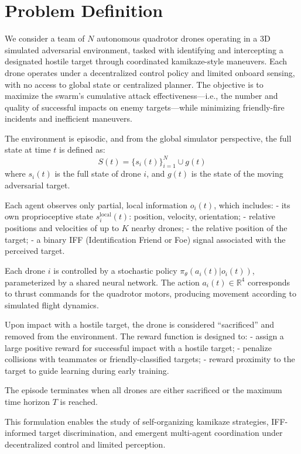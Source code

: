 \section{Problem Definition}
    We consider a team of \( N \) autonomous quadrotor drones operating in a 3D simulated adversarial environment, tasked with identifying and intercepting a designated hostile target through coordinated kamikaze-style maneuvers. Each drone operates under a decentralized control policy and limited onboard sensing, with no access to global state or centralized planner. The objective is to maximize the swarm's cumulative attack effectiveness—i.e., the number and quality of successful impacts on enemy targets—while minimizing friendly-fire incidents and inefficient maneuvers.
    \medskip

    The environment is episodic, and from the global simulator perspective, the full state at time \( t \) is defined as:
    \[
    S(t) = \{s_i(t)\}_{i=1}^N \cup g(t)
    \]
    where \( s_i(t) \) is the full state of drone \( i \), and \( g(t) \) is the state of the moving adversarial target.
    \medskip

    Each agent observes only partial, local information \( o_i(t) \), which includes:
    - its own proprioceptive state \( s_i^{\text{local}}(t) \): position, velocity, orientation;
    - relative positions and velocities of up to \( K \) nearby drones;
    - the relative position of the target;
    - a binary IFF (Identification Friend or Foe) signal associated with the perceived target.
    \medskip

    Each drone \( i \) is controlled by a stochastic policy \( \pi_\theta(a_i(t) | o_i(t)) \), parameterized by a shared neural network. The action \( a_i(t) \in \mathbb{R}^4 \) corresponds to thrust commands for the quadrotor motors, producing movement according to simulated flight dynamics.
    \medskip

    Upon impact with a hostile target, the drone is considered “sacrificed” and removed from the environment. The reward function is designed to:
    - assign a large positive reward for successful impact with a hostile target;
    - penalize collisions with teammates or friendly-classified targets;
    - reward proximity to the target to guide learning during early training.
    \medskip

    The episode terminates when all drones are either sacrificed or the maximum time horizon \( T \) is reached.
    \medskip

    This formulation enables the study of self-organizing kamikaze strategies, IFF-informed target discrimination, and emergent multi-agent coordination under decentralized control and limited perception.
    \medskip